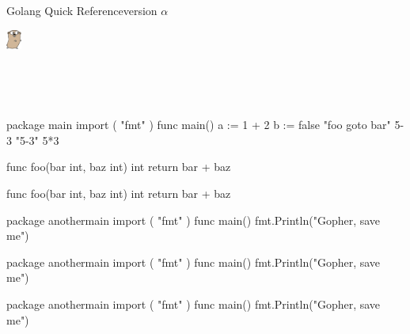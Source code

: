 \documentclass{article}
\begin{document}
\noindent
\begin{minipage}{.5\textwidth}
\Large{Golang Quick Reference}\tiny{version $\alpha$}
\end{minipage}%
\begin{minipage}{.5\textwidth}
\begin{adjustbox}{right}
\includegraphics[width=0.5cm]{./figures/gopher.eps}%
\end{adjustbox}%
\end{minipage} \\
\begin{minipage}{\textwidth}
\tt\tiny%
\begin{pagebox}
\setlength\multicolsep{0pt}%
\setlength\columnsep{3pt}%
\begin{multicols}{4}
\begin{codebox}[frametitle={Intro}]
\begin{gocode}
package main
import (
    "fmt"
)
func main() {
    a := 1 + 2
    b := false
    "foo goto bar"
    5-3
    "5-3"
    5*3
}
\end{gocode}
\end{codebox}
\begin{codebox}[frametitle={More}]
\begin{gocode}
func foo(bar int, baz int) int {
    return bar + baz
}
\end{gocode}
\end{codebox}
\begin{codebox}[frametitle={More2}]
\begin{gocode}
func foo(bar int, baz int) int {
    return bar + baz
}
\end{gocode}
\end{codebox}
\begin{codebox}
\begin{gocode}
package anothermain
import (
	"fmt"
)
func main() {
	fmt.Println("Gopher, save me")
}
\end{gocode}
\end{codebox}
\vfill
\columnbreak
\begin{codebox}
\begin{gocode}
package anothermain
import (
	"fmt"
)
func main() {
	fmt.Println("Gopher, save me")
}
\end{gocode}
\end{codebox}
\columnbreak
\begin{codebox}
\begin{gocode}
package anothermain
import (
	"fmt"
)
func main() {
	fmt.Println("Gopher, save me")
}
\end{gocode}
\end{codebox}
\end{multicols}
\end{pagebox}
\end{minipage}
\end{document}
